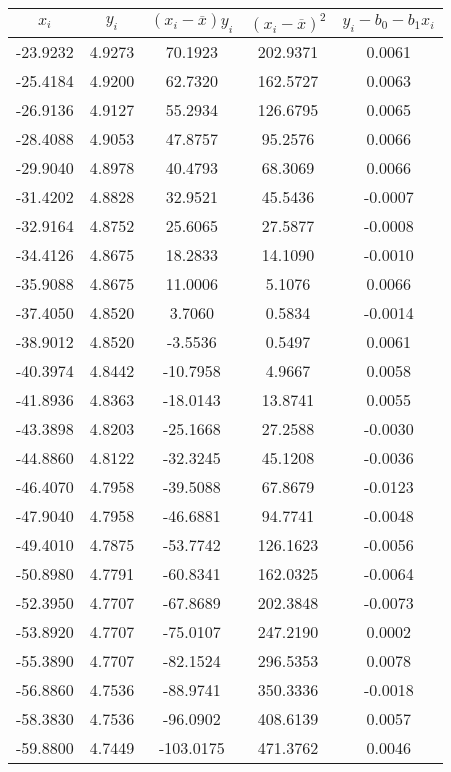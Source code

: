 \documentclass[12pt,a4paper,oneside,left=3.18,right=3.18,top=2.54,bottom=2.54]{ctexart}
\begin{document}
			\begin{table}[H]
			\centering
			\begin{tabular}{|c|c|c|c||c|}
			\hline
			$x_i$&$y_i$&$(x_i-\overline{x})y_i$&$(x_i-\overline{x})^2$&$y_i-b_0-b_1x_i$\\
			\hline
			-23.9232&4.9273&70.1923&202.9371&0.0061\\
			\hline
			-25.4184&4.9200&62.7320&162.5727&0.0063\\
			\hline
			-26.9136&4.9127&55.2934&126.6795&0.0065\\
			\hline
			-28.4088&4.9053&47.8757&95.2576&0.0066\\
			\hline
			-29.9040&4.8978&40.4793&68.3069&0.0066\\
			\hline
			-31.4202&4.8828&32.9521&45.5436&-0.0007\\
			\hline
			-32.9164&4.8752&25.6065&27.5877&-0.0008\\
			\hline
			-34.4126&4.8675&18.2833&14.1090&-0.0010\\
			\hline
			-35.9088&4.8675&11.0006&5.1076&0.0066\\
			\hline
			-37.4050&4.8520&3.7060&0.5834&-0.0014\\
			\hline
			-38.9012&4.8520&-3.5536&0.5497&0.0061\\
			\hline
			-40.3974&4.8442&-10.7958&4.9667&0.0058\\
			\hline
			-41.8936&4.8363&-18.0143&13.8741&0.0055\\
			\hline
			-43.3898&4.8203&-25.1668&27.2588&-0.0030\\
			\hline
			-44.8860&4.8122&-32.3245&45.1208&-0.0036\\
			\hline
			-46.4070&4.7958&-39.5088&67.8679&-0.0123\\
			\hline
			-47.9040&4.7958&-46.6881&94.7741&-0.0048\\
			\hline
			-49.4010&4.7875&-53.7742&126.1623&-0.0056\\
			\hline
			-50.8980&4.7791&-60.8341&162.0325&-0.0064\\
			\hline
			-52.3950&4.7707&-67.8689&202.3848&-0.0073\\
			\hline
			-53.8920&4.7707&-75.0107&247.2190&0.0002\\
			\hline
			-55.3890&4.7707&-82.1524&296.5353&0.0078\\
			\hline
			-56.8860&4.7536&-88.9741&350.3336&-0.0018\\
			\hline
			-58.3830&4.7536&-96.0902&408.6139&0.0057\\
			\hline
			-59.8800&4.7449&-103.0175&471.3762&0.0046\\
			\hline
			\end{tabular}
			\end{table}
\end{document}
